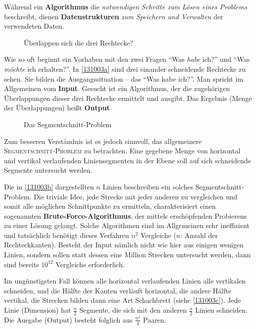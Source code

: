 \documentclass[ngerman]{scrreprt}%
\theoremstyle{break}
\begin{document}
Während ein \textbf{Algorithmus} die \emph{notwendigen Schritte zum Lösen
eines Problems} beschreibt, dienen \textbf{Datenstrukturen}
\emph{zum Speichern und Verwalten} der verwendeten Daten.  

\begin{figure}
  \centering
  
  \caption{Überlappen sich die drei Rechtecke?}
  \label{131003a}
\end{figure}

Wie so oft beginnt ein Vorhaben mit den zwei Fragen "`Was \emph{habe}
ich?"' und "`Was \emph{möchte} ich erhalten?"'. In \autoref{131003a}
sind drei einander schneidende Rechtecke zu sehen. Sie bilden die
Ausgangssituation -- das "`Was habe ich?"'. Man spricht im Allgemeinen vom
\textbf{Input}. Gesucht ist ein Algorithmus, der die zugehörigen
Überlappungen dieser drei Rechtecke ermittelt und ausgibt. Das Ergebnis (Menge der Überlappungen)
heißt \textbf{Output}.

\begin{figure}
  \centering
  
  \caption{Das Segmentschnitt-Problem}
  \label{131003b}
\end{figure}

Zum besseren Verständnis ist es jedoch sinnvoll, das allgemeinere
\textsc{Segmentschnitt-Problem} zu betrachten. Eine
gegebene Menge von horizontal und vertikal verlaufenden Liniensegmenten
in der Ebene soll auf sich schneidende Segmente untersucht werden.

Die in \autoref{131003b} dargestellten $n$ Linien beschreiben ein
solches Segmentschnitt-Problem. Die triviale Idee, jede Strecke mit jeder
anderen zu vergleichen und somit alle möglichen Schnittpunkte zu
ermitteln, charakterisiert einen sogenannten
\textbf{Brute-Force-Algorithmus}, der mittels erschöpfenden Probierens zu
einer Lösung gelangt. Solche Algorithmen sind im Allgemeinen sehr
ineffizient und tatsächlich benötigt dieses Verfahren $n^2$ Vergleiche
($n$: Anzahl der Rechteckkanten). Besteht der Input nämlich nicht wie
hier aus einigen wenigen Linien, sondern sollen statt dessen eine Million
Strecken untersucht werden, dann sind bereits $10^{12}$ Vergleiche
erforderlich.

Im ungünstigsten Fall können alle horizontal verlaufenden Linien
alle vertikalen schneiden, und die Hälfte der Kanten verläuft
horizontal, die andere Hälfte vertikal, die Strecken bilden dann eine
Art Schachbrett (siehe \autoref{131003c}). Jede Linie (Dimension) hat $\frac{n}{2}$ Segmente,
die sich mit den anderen $\frac{n}{2}$ Linien schneiden.  Die Ausgabe
(Output) besteht folglich aus $\frac{n^2}{4}$ Paaren. 
\end{document}
